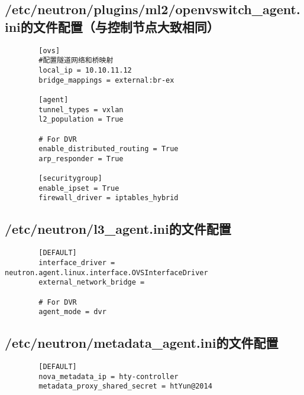 \documentclass[a4paper,left=1.5cm,right=1.5cm,11pt]{article}
\begin{document}
\subsection{/etc/neutron/plugins/ml2/openvswitch_agent.ini的文件配置（与控制节点大致相同）}
	\begin{lstlisting}
		[ovs]
		#配置隧道网络和桥映射
		local_ip = 10.10.11.12
		bridge_mappings = external:br-ex

		[agent]
		tunnel_types = vxlan
		l2_population = True

		# For DVR
		enable_distributed_routing = True
		arp_responder = True

		[securitygroup]
		enable_ipset = True
		firewall_driver = iptables_hybrid
	\end{lstlisting}
\subsection{/etc/neutron/l3_agent.ini的文件配置}
	\begin{lstlisting}
		[DEFAULT]
		interface_driver = neutron.agent.linux.interface.OVSInterfaceDriver
		external_network_bridge =
		
		# For DVR
		agent_mode = dvr
	\end{lstlisting}
\subsection{/etc/neutron/metadata_agent.ini的文件配置}
	\begin{lstlisting}
		[DEFAULT]
		nova_metadata_ip = hty-controller
		metadata_proxy_shared_secret = htYun@2014
	\end{lstlisting}
\end{document}
